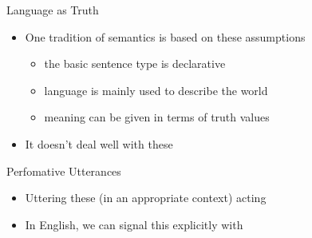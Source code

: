 \documentclass{beamer}
\begin{document}
\begin{frame}{Language as Truth}
\begin{itemize}
\item One tradition of semantics is based on these assumptions
  \begin{itemize}
  \item the basic sentence type is declarative
  \item language is mainly used to describe the world
  \item meaning can be given in terms of truth values
  \end{itemize}
\item It doesn't deal well with these
  \begin{exe}
    \ex {}
    \ex {}
    \ex {}
    \ex {}
    \ex {}
  \end{exe}
\end{itemize}

\end{frame}

\begin{frame}{Perfomative Utterances}

\begin{exe}
  \ex {}
  \ex {}
  \ex {} 
  \ex {}
  \ex {}
\end{exe}

\begin{itemize}
\item Uttering these (in an appropriate context)  acting
\\  
\item In English, we can signal this explicitly with 
\end{itemize}

\end{frame}
\end{document}
